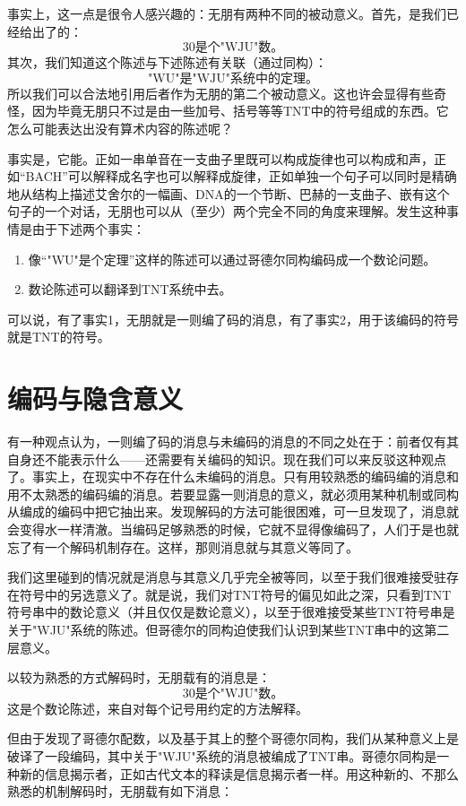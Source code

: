 事实上，这一点是很令人感兴趣的：无朋有两种不同的被动意义。首先，是我们已经给出了的：
\[
\text{$30$是个"WJU"数。}
\]
其次，我们知道这个陈述与下述陈述有关联（通过同构）：
\[
\text{"WU"是"WJU"系统中的定理。}
\]
所以我们可以合法地引用后者作为无朋的第二个被动意义。这也许会显得有些奇怪，因为毕竟无朋只不过是由一些加号、括号等等TNT中的符号组成的东西。它怎么可能表达出没有算术内容的陈述呢？

事实是，它能。正如一串单音在一支曲子里既可以构成旋律也可以构成和声，正如“BACH”可以解释成名字也可以解释成旋律，正如单独一个句子可以同时是精确地从结构上描述艾舍尔的一幅画、DNA的一个节断、巴赫的一支曲子、嵌有这个句子的一个对话，无朋也可以从（至少）两个完全不同的角度来理解。发生这种事情是由于下述两个事实：
\begin{enumerate}[labelindent=0pt, label=事实\arabic*, format=\textsf]
\item 像“"WU"是个定理”这样的陈述可以通过哥德尔同构编码成一个数论问题。
\item 数论陈述可以翻译到TNT系统中去。
\end{enumerate}
可以说，有了事实1，无朋就是一则编了码的消息，有了事实2，用于该编码的符号就是TNT的符号。

\section{编码与隐含意义}

有一种观点认为，一则编了码的消息与未编码的消息的不同之处在于：前者仅有其自身还不能表示什么——还需要有关编码的知识。现在我们可以来反驳这种观点了。事实上，在现实中不存在什么未编码的消息。只有用较熟悉的编码编的消息和用不太熟悉的编码编的消息。若要显露一则消息的意义，就必须用某种机制或同构从编成的编码中把它抽出来。发现解码的方法可能很困难，可一旦发现了，消息就会变得水一样清澈。当编码足够熟悉的时候，它就不显得像编码了，人们于是也就忘了有一个解码机制存在。这样，那则消息就与其意义等同了。

我们这里碰到的情况就是消息与其意义几乎完全被等同，以至于我们很难接受驻存在符号中的另选意义了。就是说，我们对TNT符号的偏见如此之深，只看到TNT符号串中的数论意义（并且仅仅是数论意义），以至于很难接受某些TNT符号串是关于"WJU"系统的陈述。但哥德尔的同构迫使我们认识到某些TNT串中的这第二层意义。

以较为熟悉的方式解码时，无朋载有的消息是：
\[
\text{$30$是个"WJU"数。}
\]
这是个数论陈述，来自对每个记号用约定的方法解释。

但由于发现了哥德尔配数，以及基于其上的整个哥德尔同构，我们从某种意义上是破译了一段编码，其中关于"WJU"系统的消息被编成了TNT串。哥德尔同构是一种新的信息揭示者，正如古代文本的释读是信息揭示者一样。用这种新的、不那么熟悉的机制解码时，无朋载有如下消息：

